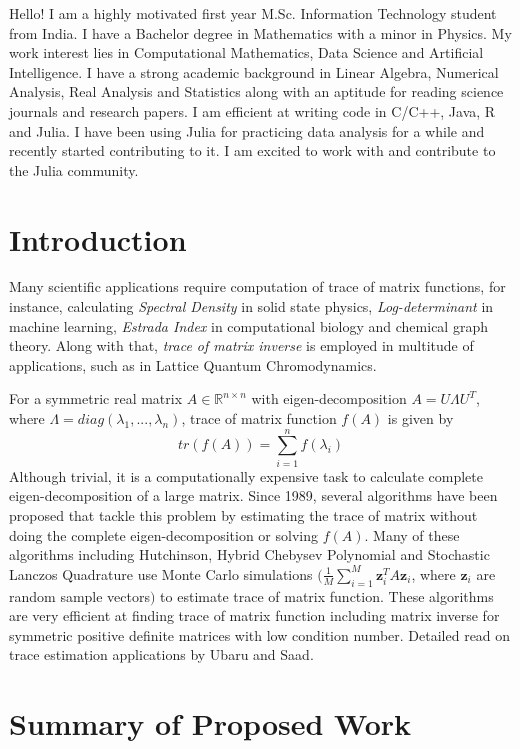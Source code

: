 \documentclass[12]{article}
\begin{document}
Hello! I am a highly motivated first year M.Sc. Information Technology student from India. I have a Bachelor degree in Mathematics with a minor in Physics. My work interest lies in Computational Mathematics, Data Science and Artificial Intelligence. I have a strong academic background in Linear Algebra, Numerical Analysis, Real Analysis and Statistics along with an aptitude for reading science journals and research papers. I am efficient at writing code in C/C++, Java, R and Julia. I have been using Julia for practicing data analysis for a while and recently started contributing to it. I am excited to work with and contribute to the Julia community. 

\section{Introduction}

Many scientific applications require computation of trace of matrix functions, for instance, calculating \textit{Spectral Density} in solid state physics, \textit{Log-determinant} in machine learning, \textit{Estrada Index} in computational biology and chemical graph theory. Along with that, \textit{trace of matrix inverse} is employed in multitude of applications, such as in Lattice Quantum Chromodynamics. 

For a symmetric real matrix $A \in \mathbb{R}^{n \times n}$ with eigen-decomposition $A = U\Lambda U^T$, where $\Lambda = diag(\lambda_1,...,\lambda_n)$, trace of matrix function $f(A)$ is given by
$$tr(f(A)) = \sum^n_{i=1}f(\lambda_i)$$
Although trivial, it is a computationally expensive task to calculate complete eigen-decomposition of a large matrix. Since 1989, several algorithms have been proposed that tackle this problem by estimating the trace of matrix without doing the complete eigen-decomposition or solving $f(A)$. Many of these algorithms including Hutchinson, Hybrid Chebysev Polynomial and Stochastic Lanczos Quadrature use Monte Carlo simulations $(\frac{1}{M}\sum^M_{i=1} \textbf{z}^T_iA\textbf{z}_i$, where $\textbf{z}_i$ are random sample vectors$)$ to estimate trace of matrix function. These algorithms are very efficient at finding trace of matrix function including matrix inverse for symmetric positive definite matrices with low condition number. Detailed read on trace estimation applications by Ubaru and Saad\cite{ubaru2017applications}.

\section{Summary of Proposed Work}
\end{document}
